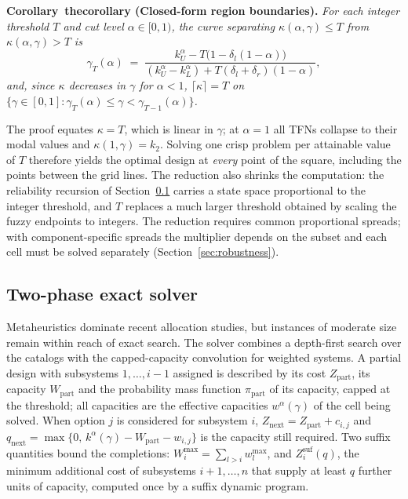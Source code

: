 \documentclass[Review,sagev,times]{sagej}%
\newcommand{\stmt}[3]{\refstepcounter{#1}\label{#2}#3~\csname the#1\endcsname}
\newcommand{\kag}{k^{\alpha}(\gamma)}\newcommand{\WS}{\tilde{W}_S}\newcommand{\Zsuf}{Z^{\mathrm{suf}}}
\begin{document}
\textbf{\stmt{corollary}{cor:partition}{Corollary} (Closed-form region boundaries).}
\textit{For each integer threshold $T$ and cut level $\alpha \in [0, 1)$, the curve separating $\kappa(\alpha,\gamma) \le T$
from $\kappa(\alpha,\gamma) > T$ is}
\begin{equation}
\gamma_T(\alpha) \;=\; \frac{k_U^\alpha - T\big(1 - \delta_l(1-\alpha)\big)}{(k_U^\alpha - k_L^\alpha) + T(\delta_l + \delta_r)(1-\alpha)},
\label{eq:gamma_T}
\end{equation}
\textit{and, since $\kappa$ decreases in $\gamma$ for $\alpha<1$, $\lceil\kappa\rceil = T$ on
$\{\gamma \in [0,1] : \gamma_T(\alpha) \le \gamma < \gamma_{T-1}(\alpha)\}$.}

The proof equates $\kappa=T$, which is linear in $\gamma$; at $\alpha=1$ all TFNs collapse to their modal values
and $\kappa(1,\gamma)=k_2$. Solving one crisp problem per attainable value of $T$ therefore yields the optimal
design at \emph{every} point of the square, including the points between the grid lines. The reduction also
shrinks the computation: the reliability recursion of Section~\ref{sec:solver} carries a state space
proportional to the integer threshold, and $T$ replaces a much larger threshold obtained by scaling the fuzzy
endpoints to integers. The reduction requires common proportional spreads; with component-specific spreads the
multiplier depends on the subset and each cell must be solved separately (Section~\ref{sec:robustness}).

\subsection{Two-phase exact solver} \label{sec:solver}
Metaheuristics dominate recent allocation studies\cite{DeviGarg2023}, but instances of moderate size remain
within reach of exact search\cite{Garg2013,Kuo2007}. The solver combines a depth-first search over the catalogs
with the capped-capacity convolution for weighted systems\cite{WuChen1994,DingZuoLisnianski2010,Bisht2023}.
A partial design with subsystems $1,\dots,i-1$ assigned is described by its cost $Z_{\mathrm{part}}$, its
capacity $W_{\mathrm{part}}$ and the probability mass function $\pi_{\mathrm{part}}$ of its capacity, capped at
the threshold; all capacities are the effective capacities $w^\alpha(\gamma)$ of the cell being solved. When
option $j$ is considered for subsystem $i$, $Z_{\mathrm{next}} = Z_{\mathrm{part}} + c_{i,j}$ and
$q_{\mathrm{next}} = \max\{0,\,\kag - W_{\mathrm{part}} - w_{i,j}\}$ is the capacity still required. Two suffix
quantities bound the completions: $W^{\mathrm{max}}_i = \sum_{l>i} w_l^{\mathrm{max}}$, and $\Zsuf_{i}(q)$, the
minimum additional cost of subsystems $i+1,\dots,n$ that supply at least $q$ further units of capacity,
computed once by a suffix dynamic program.
\end{document}
